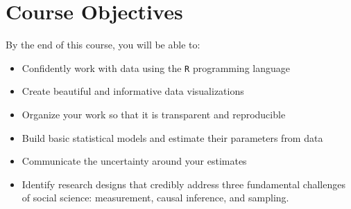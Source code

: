 \documentclass[11pt, letterpaper]{article}
\begin{document}
\section*{Course Objectives}
By the end of this course, you will be able to:
\begin{itemize}
	\item Confidently work with data using the \texttt{R} programming language
	\item Create beautiful and informative data visualizations
	\item Organize your work so that it is transparent and reproducible
	\item Build basic statistical models and estimate their parameters from data
	\item Communicate the uncertainty around your estimates
	\item Identify research designs that credibly address three fundamental challenges of social science: measurement, causal inference, and sampling.
\end{itemize}
\end{document}
